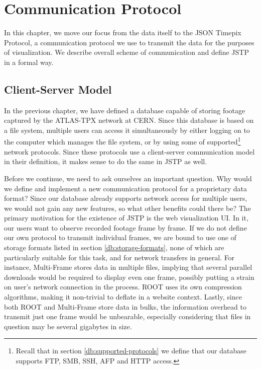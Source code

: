 \chapter{Communication Protocol}
\label{protocol:introduction}

In this chapter, we move our focus from the data itself to the JSON Timepix Protocol, a communication protocol we use to transmit the data for the purposes of visualization. We describe overall scheme of communication and define JSTP in a formal way.

\section{Client-Server Model}
In the previous chapter, we have defined a database capable of storing footage captured by the ATLAS-TPX network at CERN. Since this database is based on a file system, multiple users can access it simultaneously by either logging on to the computer which manages the file system, or by using some of supported\footnote{Recall that in section \ref{db:supported-protocols} we define that our database supports FTP, SMB, SSH, AFP and HTTP access.} network protocols. Since these protocols use a client-server communication model in their definition, it makes sense to do the same in JSTP as well.

Before we continue, we need to ask ourselves an important question. Why would we define and implement a new communication protocol for a proprietary data format? Since our database already supports network access for multiple users, we would not gain any new features, so what other benefits could there be? The primary motivation for the existence of JSTP is the web visualization UI. In it, our users want to observe recorded footage frame by frame. If we do not define our own protocol to transmit individual frames, we are bound to use one of storage formats listed in section \ref{db:storage-formats}, none of which are particularly suitable for this task, and for network transfers in general. For instance, Multi-Frame stores data in multiple files, implying that several parallel downloads would be required to display even one frame, possibly putting a strain on user's network connection in the process. ROOT uses its own compression algorithms, making it non-trivial to deflate in a website context. Lastly, since both ROOT and Multi-Frame store data in bulks, the information overhead to transmit just one frame would be unbearable, especially considering that files in question may be several gigabytes in size.


